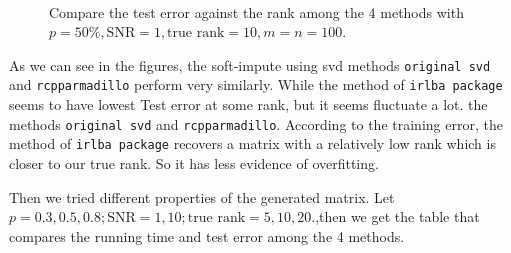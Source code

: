 \documentclass{article}
\begin{document}
\begin{figure}[!htb]
  \centering
~
  \caption{Compare the test error against the rank among the 4 methods with $p = 50\%, \mathrm{SNR} = 1, \textrm{true rank} = 10, m = n =100.$}\label{comparison_testerror}
\end{figure}

As we can see in the figures, the soft-impute using svd methods \verb|original svd| and \verb|rcpparmadillo| perform very similarly. While the method of \verb|irlba package| seems to have lowest Test error at some rank, but it seems fluctuate a lot. the methods \verb|original svd| and \verb|rcpparmadillo|. According to the training error, the method of \verb|irlba package| recovers a matrix with a relatively low rank which is closer to our true rank. So it has less evidence of overfitting.

Then we tried different properties of the generated matrix. Let $p = 0.3,0.5,0.8 ;\textrm{SNR} = 1,10; \textrm{true rank} = 5,10,20.$,then we get the table that compares the running time and test error among the 4 methods.
\end{document}
